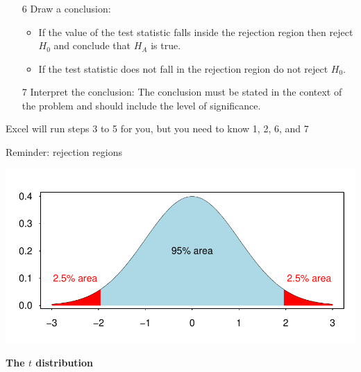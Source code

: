 \documentclass[12pt,xcolor=dvipsnames,handout,mathserif,aspectratio=169]{beamer}
\newcommand{\bbl}[1]{{\color{NavyBlue} \textbf{#1}}}
\begin{document}
\begin{frame}\frametitle{}
\begin{enumerate}
\item[6] Draw a conclusion:\\
\begin{itemize}
\item If the value of the test statistic falls inside the rejection region then reject $H_0$ and conclude that $H_A$ is true.
\vspace*{0.5cm}
\item If the test statistic does not fall in the rejection region do not reject $H_0$. 
 \end{itemize}
\item[7] Interpret the conclusion: The conclusion must be stated in the context of the problem and should include the level of significance.
    \end{enumerate}
Excel will run steps 3 to 5 for you, but you need to know 1, 2, 6, and 7
\end{frame}

\begin{frame}{Reminder: rejection regions}

\begin{center}
\includegraphics[width=\textwidth]{normal_areas.pdf}
\end{center}

\end{frame}

\begin{frame}[fragile]{}
\bbl{\Huge The $t$ distribution}\\ 
\vspace{0.5cm}
\end{frame}
\end{document}
